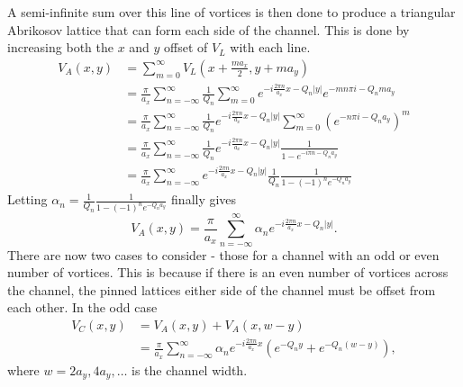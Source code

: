 \documentclass{article}
\numberwithin{equation}{section}
\begin{document}
A semi-infinite sum over this line of vortices is then done to produce a triangular Abrikosov lattice that can form each side of the channel. This is done by increasing both the $x$ and $y$ offset of $V_L$ with each line.
\begin{align*}
    V_A(x, y) &= \sum_{m=0}^\infty V_L\left(x+\frac{ma_x}{2},y+ma_y\right) \\
    &= \frac{\pi}{a_x}\sum_{n=-\infty}^\infty\frac{1}{Q_n}\sum_{m=0}^\infty
    e^{-i\frac{2\pi n}{a_x}x-Q_n|y|}e^{-mn\pi i-Q_nma_y} \\
    &= \frac{\pi}{a_x}\sum_{n=-\infty}^\infty\frac{1}{Q_n}e^{-i\frac{2\pi n}{a_x}x-Q_n|y|} \sum_{m=0}^\infty\left(e^{-n\pi i-Q_na_y}\right)^m \\
    &= \frac{\pi}{a_x}\sum_{n=-\infty}^\infty\frac{1}{Q_n}e^{-i\frac{2\pi n}{a_x}x-Q_n|y|} \frac{1}{1-e^{-i\pi n-Q_na_y}} \\
    &= \frac{\pi}{a_x}\sum_{n=-\infty}^\infty e^{-i\frac{2\pi n}{a_x}x-Q_n|y|} \frac{1}{Q_n}\frac{1}{1-(-1)^ne^{-Q_na_y}}
\end{align*}
Letting $\alpha_n = \frac{1}{Q_n}\frac{1}{1-(-1)^ne^{-Q_na_y}}$ finally gives
\begin{equation}
    V_A(x, y) = \frac{\pi}{a_x}\sum_{n=-\infty}^\infty\alpha_n e^{-i\frac{2\pi n}{a_x}x-Q_n|y|}.
\end{equation}
There are now two cases to consider - those for a channel with an odd or even number of vortices. This is because if there is an even number of vortices across the channel, the pinned lattices either side of the channel must be offset from each other.
In the odd case
\begin{align}
    V_C(x, y) &= V_A(x, y) + V_A(x, w-y) \nonumber \\
    &= \frac{\pi}{a_x}\sum_{n=-\infty}^\infty\alpha_n e^{-i\frac{2\pi n}{a_x}x} \left(e^{-Q_ny}+e^{-Q_n(w-y)}\right), \label{eqn:V_Codd}
\end{align}
where $w = 2a_y, 4a_y, \ldots$ is the channel width.
\end{document}
